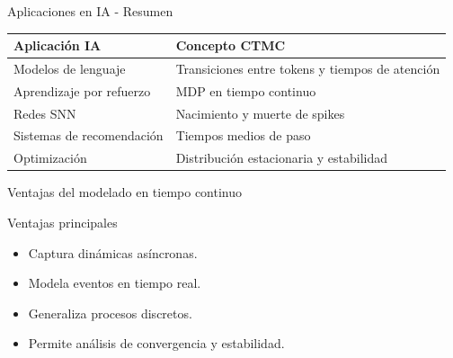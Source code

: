 \documentclass[aspectratio=169]{beamer}
\theoremstyle{plain}
\theoremstyle{definition}
\newcommand{\1}{\mathbf{1}}
\begin{document}
\begin{frame}{Aplicaciones en IA - Resumen}
  \small
  \begin{center}
    \begin{tabular}{|p{}|p{}|}
      \hline
      \textbf{Aplicación IA} & \textbf{Concepto CTMC} \\
      \hline
      Modelos de lenguaje & Transiciones entre tokens y tiempos de atención \\
      Aprendizaje por refuerzo & MDP en tiempo continuo \\
      Redes SNN & Nacimiento y muerte de spikes \\
      Sistemas de recomendación & Tiempos medios de paso \\
      Optimización & Distribución estacionaria y estabilidad \\
      \hline
    \end{tabular}
  \end{center}
\end{frame}

\begin{frame}{Ventajas del modelado en tiempo continuo}
  \begin{block}{Ventajas principales}
    \begin{itemize}
      \item Captura dinámicas asíncronas.
      \item Modela eventos en tiempo real.
      \item Generaliza procesos discretos.
      \item Permite análisis de convergencia y estabilidad.
    \end{itemize}
  \end{block}
\end{frame}
\end{document}
